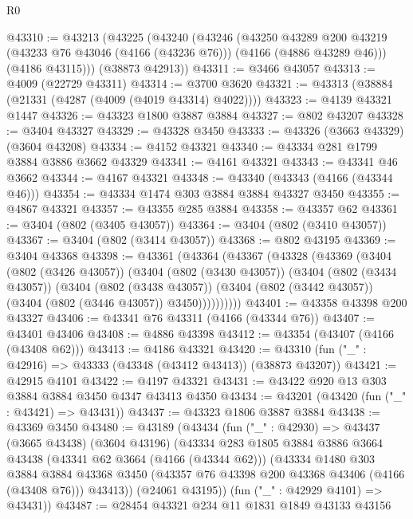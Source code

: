\begin{lexlean}{R0}
\begin{coremodule}
@43310 := @43213
    (@43225
      (@43240
        (@43246
          (@43250
            @43289
            @200
            @43219
            (@43233 @76 @43046 (@4166 (@43236 @76)))
            (@4166 (@4886 @43289 @46)))
          (@4186 @43115)))
      (@38873 @42913))
@43311 := @3466 @43057
@43313 := @4009 (@22729 @43311)
@43314 := @3700 @3620
@43321 := @43313 (@38884 (@21331 (@4287 (@4009 (@4019 @43314) @4022))))
@43323 := @4139 @43321 @1447
@43326 := @43323 @1800 @3887 @3884
@43327 := @802 @43207
@43328 := @3404 @43327
@43329 := @43328 @3450
@43333 := @43326 (@3663 @43329) (@3604 @43208)
@43334 := @4152 @43321
@43340 := @43334 @281 @1799 @3884 @3886 @3662 @43329
@43341 := @4161 @43321
@43343 := @43341 @46 @3662
@43344 := @4167 @43321
@43348 := @43340 (@43343 (@4166 (@43344 @46)))
@43354 := @43334 @1474 @303 @3884 @3884 @43327 @3450
@43355 := @4867 @43321
@43357 := @43355 @285 @3884
@43358 := @43357 @62
@43361 := @3404 (@802 (@3405 @43057))
@43364 := @3404 (@802 (@3410 @43057))
@43367 := @3404 (@802 (@3414 @43057))
@43368 := @802 @43195
@43369 := @3404 @43368
@43398 := @43361
    (@43364
      (@43367
        (@43328
          (@43369
            (@3404
              (@802 (@3426 @43057))
              (@3404
                (@802 (@3430 @43057))
                (@3404
                  (@802 (@3434 @43057))
                  (@3404
                    (@802 (@3438 @43057))
                    (@3404 (@802 (@3442 @43057)) (@3404 (@802 (@3446 @43057)) @3450))))))))))
@43401 := @43358 @43398 @200 @43327
@43406 := @43341 @76 @43311 (@4166 (@43344 @76))
@43407 := @43401 @43406
@43408 := @4886 @43398
@43412 := @43354 (@43407 (@4166 (@43408 @62)))
@43413 := @4186 @43321
@43420 := @43310 (fun ("_" : @42916) => @43333 (@43348 (@43412 @43413)) (@38873 @43207))
@43421 := @42915 @4101
@43422 := @4197 @43321
@43431 := @43422 @920 @13 @303 @3884 @3884 @3450 @4347 @43413 @4350
@43434 := @43201 (@43420 (fun ("_" : @43421) => @43431))
@43437 := @43323 @1806 @3887 @3884
@43438 := @43369 @3450
@43480 := @43189
    (@43434
      (fun ("_" : @42930) =>
      @43437
        (@3665 @43438)
        (@3604 @43196)
        (@43334
          @283
          @1805
          @3884
          @3886
          @3664
          @43438
          (@43341 @62 @3664 (@4166 (@43344 @62)))
          (@43334
            @1480
            @303
            @3884
            @3884
            @43368
            @3450
            (@43357 @76 @43398 @200 @43368 @43406 (@4166 (@43408 @76)))
            @43413))
        (@24061 @43195))
      (fun ("_" : @42929 @4101) => @43431))
@43487 := @28454 @43321 @234 @11 @1831 @1849 @43133 @43156

\end{coremodule}
\end{lexlean}

